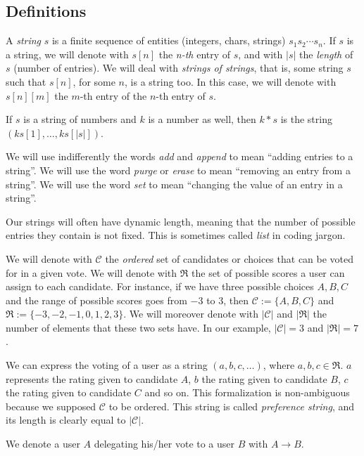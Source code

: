 \documentclass[submission, copyright,creativecommons,sharealike,noncommercial]{eptcs}
\newcommand{\candidates}{\ensuremath{\mathcal{C}} \xspace}
\newcommand{\range}{\ensuremath{\mathfrak{R}}\xspace}
\begin{document}
\subsection{Definitions}\label{subsec:Definitions}
%
	\begin{definition}
		A \emph{string} $s$ is a finite sequence of entities (integers, chars, strings) $s_1 s_2 \cdots s_n$. If $s$ is a string, we will denote with $s[n]$ the \emph{n-th} entry of $s$, and with $|s|$ the \emph{length} of $s$ (number of entries). We will deal with \emph{strings of strings}, that is, some string $s$ such that $s[n]$, for some $n$, is a string too. In this case, we will denote with $s[n][m]$ the $m$-th entry of the $n$-th entry of $s$.
		
		If $s$ is a string of numbers and $k$ is a number as well, then $k*s$ is the string $(ks[1], \dots, ks[|s|])$.
	\end{definition}	
		We will use indifferently the words \emph{add} and \emph{append} to mean ``adding entries to a string''. We will use the word \emph{purge} or \emph{erase} to mean ``removing an entry from a string''. We will use the word \emph{set} to mean ``changing the value of an entry in a string''.

		Our strings will often have dynamic length, meaning that the number of possible entries they contain is not fixed. This is sometimes called \emph{list} in coding jargon.
%	
	\begin{definition}\label{def:candidates and range}
		We will denote with \candidates the \emph{ordered} set of candidates or choices that can be voted for in a given vote. We will denote with \range the set of possible scores a user can assign to each candidate. For instance, if we have three possible choices $A,B,C$ and the range of possible scores goes from $-3$ to $3$, then $\candidates := \{A, B, C\}$ and $\range := \{-3,-2,-1,0,1,2,3\}$. We will moreover denote with $| \candidates|$ and $|\range|$ the number of elements that these two sets have. In our example, $|\candidates | = 3$ and $|\range|=7$.
	\end{definition}
%	
	\begin{definition}\label{def:voting string}		
		We can express the voting of a user as a string $(a,b,c, \dots)$, where $a,b,c \in \range$. $a$ represents the rating given to candidate $A$, $b$ the rating given to candidate $B$, $c$ the rating given to candidate $C$ and so on. This formalization is non-ambiguous because we supposed $\candidates$ to be ordered. This string is called \emph{preference string}, and its length is clearly equal to $|\candidates|$.
	\end{definition}
%
	\begin{definition}
 		We denote a user $A$ delegating his/her vote to a user $B$ with $A \to B$.
	\end{definition}
%
%
\end{document}
